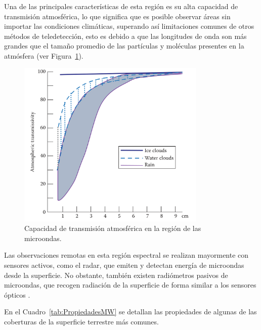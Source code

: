 Una de las principales características de esta región es su alta capacidad de transmisión atmosférica, lo que significa que es posible observar áreas sin importar las condiciones climáticas, superando así limitaciones comunes de otros métodos de teledetección, esto es debido a que las longitudes de onda son más grandes que el tamaño promedio de las partículas y moléculas presentes en la atmósfera (ver Figura~\ref{fig:LongitudOndaMW}).

\begin{figure}[H]
    \begin{center}
        \includegraphics[width=0.8\textwidth]{Images/LongitudOndaMW.png}
    \end{center}
    \caption{Capacidad de transmisión atmosférica en la región de las microondas.}
    \label{fig:LongitudOndaMW}
\end{figure}

Las observaciones remotas en esta región espectral se realizan mayormente con sensores activos, como el radar, que emiten y detectan energía de microondas desde la superficie. No obstante, también existen radiómetros pasivos de microondas, que recogen radiación de la superficie de forma similar a los sensores ópticos \cite{chuvieco2016fundamentals}.

En el Cuadro~\ref{tab:PropiedadesMW} se detallan las propiedades de algunas de las coberturas de la superficie terrestre más comunes.

